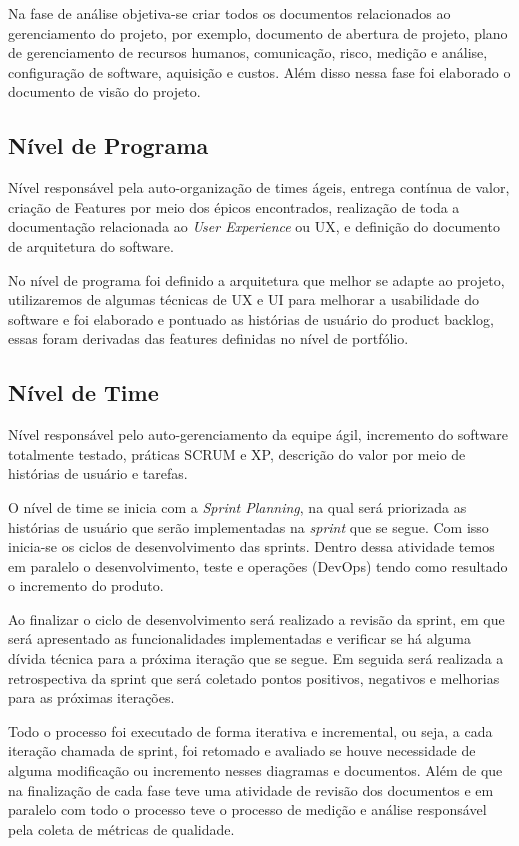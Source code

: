 Na fase de análise objetiva-se criar todos os documentos relacionados ao gerenciamento do projeto, por exemplo,
documento de abertura de projeto, plano de gerenciamento de recursos humanos, comunicação, risco, medição e análise,
configuração de software, aquisição e custos. Além disso nessa fase foi elaborado o documento de visão do projeto.

\subsection{Nível de Programa}

Nível responsável pela auto-organização de times ágeis, entrega contínua de valor, criação de Features por meio dos épicos encontrados, realização de toda a documentação relacionada ao \textit{User Experience} ou UX, e definição do documento de arquitetura do software.


No nível de programa foi definido a arquitetura que melhor se adapte ao projeto, utilizaremos de algumas técnicas de UX
e UI para melhorar a usabilidade do software e foi elaborado e pontuado as histórias de usuário do product backlog,
essas foram derivadas das features definidas no nível de portfólio.

\subsection{Nível de Time}

Nível responsável pelo auto-gerenciamento da equipe ágil, incremento do software totalmente testado, práticas SCRUM e XP, descrição do valor por meio de histórias de usuário e tarefas.

O nível de time se inicia com a \textit{Sprint Planning}, na qual será priorizada as histórias de usuário que serão implementadas na \textit{sprint} que se segue. Com isso inicia-se os ciclos de desenvolvimento das sprints. Dentro dessa atividade temos em paralelo o desenvolvimento, teste e operações (DevOps) tendo como resultado o incremento do produto.

Ao finalizar o ciclo de desenvolvimento será realizado a revisão da sprint, em que será apresentado as funcionalidades implementadas e verificar se há alguma dívida técnica para a próxima iteração que se segue. Em seguida será realizada a retrospectiva da sprint que será coletado pontos positivos, negativos e melhorias para as próximas iterações.

Todo o processo foi executado de forma iterativa e incremental, ou seja, a cada iteração chamada de sprint, foi retomado e avaliado se houve necessidade de alguma modificação ou incremento nesses diagramas e documentos. Além de que na finalização de cada fase teve uma atividade de revisão dos documentos e em paralelo com todo o processo teve o processo de medição e análise responsável pela coleta de métricas de qualidade.
